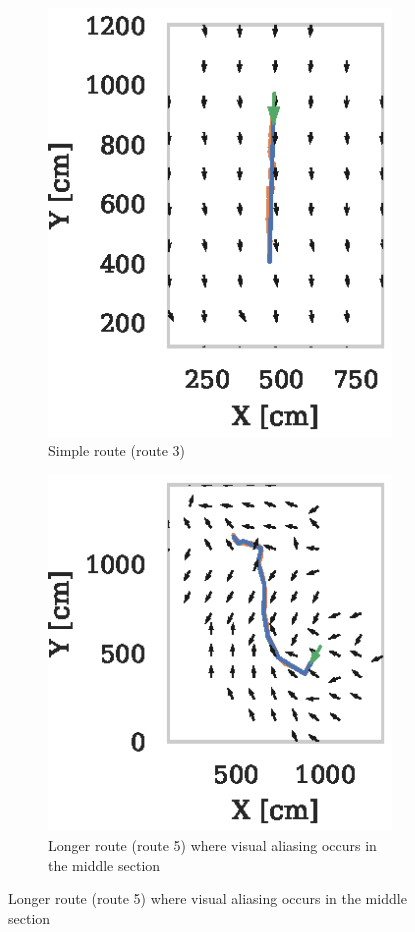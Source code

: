 \documentclass[letterpaper]{article}
\begin{document}
\begin{figure}[t]
    \centering
    \begin{subfigure}[t]{0.24\textwidth}
        \includegraphics{figures/vector_field_route3_PerfectMemory_mask.eps}
        \caption{Simple route (route 3)}
        \label{fig:vector_fields/route3_perfect_memory_mask}
    \end{subfigure}
    \begin{subfigure}[t]{0.24\textwidth}
        \includegraphics{figures/vector_field_route5_PerfectMemory_mask.eps}
        \caption{Longer route (route 5) where visual aliasing occurs in the middle section}

\end{subfigure}
\end{figure}
\end{document}
